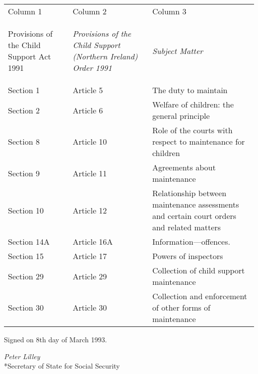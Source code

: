 \documentclass[12pt,a4paper]{article}
\begin{document}
\noindent
\begin{longtable}{p{71.1145pt}p{108.42673pt}p{174.45883pt}}
\hline
Column 1 & Column 2 & Column 3\\
\itshape\raggedright Provisions of the Child Support Act 1991 & \itshape Provisions of the Child Support (Northern Ireland) Order 1991 & \itshape Subject Matter\\
\hline
\endhead
\hline
\endlastfoot
Section 1&Article 5&The duty to maintain\\
Section 2&Article 6&Welfare of children: the general principle\\
Section 8&Article 10&Role of the courts with respect to maintenance for children\\
Section 9&Article 11&Agreements about maintenance\\
Section 10&Article 12&Relationship between maintenance assessments and certain court orders and related matters\\
Section 14A &Article 16A &Information—offences. \\ %
Section 15&Article 17&Powers of inspectors\\
Section 29&Article 29&Collection of child support maintenance\\
Section 30&Article 30&Collection and enforcement of other forms of maintenance\\
\end{longtable}


\bigskip

Signed on 8th day of March 1993.

{\raggedleft
\emph{Peter Lilley}\\*Secretary of State for Social Security

}

\bigskip
\end{document}
